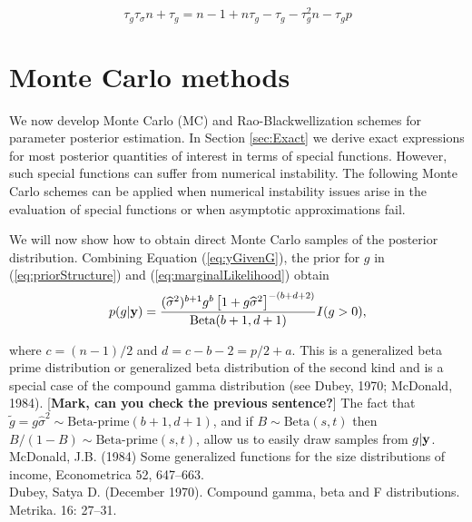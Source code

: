 \documentclass{article}[12pt]
\newcommand{\joc}[1]{{\color{red}#1}}
\begin{document}
$$
\tau_g\tau_\sigma n  + \tau_g   = n - 1  + n\tau_g - \tau_g - \tau_g^2 n - \tau_g p
$$
 
\section{Monte Carlo methods}
\label{sec:MonteCarlo}

We now develop  
Monte Carlo (MC) and Rao-Blackwellization
schemes for parameter posterior estimation.
In Section \ref{sec:Exact} we derive
exact expressions for most posterior quantities of interest in terms of special
functions. However, such special functions can suffer from numerical instability.
The following Monte Carlo schemes can be applied when numerical instability
issues arise in the evaluation of special functions or when
asymptotic approximations fail. 

We will now show how to obtain direct Monte Carlo samples of the posterior distribution.
Combining Equation (\ref{eq:yGivenG}), the prior for $g$ in
(\ref{eq:priorStructure}) and (\ref{eq:marginalLikelihood})
obtain
\begin{equation}\label{res:06}
p(g|{\bf y}) = \frac{(\widehat{\sigma}^2)^{b+1} g^{b} \left[  1 + g \widehat{\sigma}^2 \right]^{-(b + d + 2)}}{\mbox{Beta}(b + 1,d+1)}I(g>0),
\end{equation}

\noindent where $c = (n-1)/2$ and $d = c - b - 2 = p/2 + a$. 
This is a generalized beta prime distribution 
or generalized beta distribution of the second kind and
is a special case of the compound gamma distribution
(see Dubey, 1970; McDonald, 1984). [{\bf Mark, can you check the previous sentence?}] The fact that $\widetilde{g} = g \widehat{\sigma}^2 \sim \mbox{Beta-prime}(b+1,d+1)$,
and
if $B\sim \mbox{Beta}(s,t)$ then $B/(1 - B)\sim \mbox{Beta-prime}(s,t)$, allow us to easily draw samples from
$g|{\bf y}$. \\


McDonald, J.B. (1984) Some generalized functions for the size distributions of income, Econometrica 52, 647--663. \\

Dubey, Satya D. (December 1970). Compound gamma, beta and F distributions. Metrika. 16: 27--31.  \\





\end{document}
